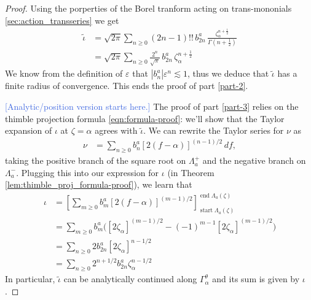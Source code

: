 \documentclass{article}
\newcommand{\fracderiv}[3]{\partial^{#1}_{#2, #3}}
\newcommand{\laplace}{\mathcal{L}}
\theoremstyle{definition}
\theoremstyle{plain}
\begin{document}
{\begin{proof}
Using the porperties of the Borel tranform acting on trans-mononials \ref{sec:action_transseries} we get 
\begin{align*}
\tilde{\iota} & = \sqrt{2\pi} \sum_{n \ge 0} (2n - 1)!! \,b_{2n}^a\,\frac{\zeta_\alpha^{n+\tfrac{1}{2}}}{\Gamma(n+\tfrac{1}{2})} \\
&= \sqrt{2\pi} \sum_{n \ge 0} \frac{2^n}{\sqrt{\pi}} \,b_{2n}^a\,\zeta_\alpha^{n+\tfrac{1}{2}}
\end{align*}
We know from the definition of $\varepsilon$ that $\left|b_n^a\right| \varepsilon^n \lesssim 1$, thus we deduce that $\tilde{\iota}$ has a finite radius of convergence. This ends the proof of part \ref{part-2}. %

\textcolor{RoyalBlue}{[Analytic/position version starts here.]} The proof of part \ref{part-3} relies on the thimble projection formula \eqref{eqn:formula-proof}: we'll show that the Taylor expansion of $\iota$ at $\zeta=\alpha$ agrees with $\tilde{\iota}$. We can rewrite the Taylor series for $\nu$ as
\begin{align*}
\nu & = \sum_{n \ge 0} b_n^a [2(f - \alpha)]^{(n - 1)/2}\,df,
\end{align*}
taking the positive branch of the square root on $\Lambda^+_a$ and the negative branch on $\Lambda^-_a$. Plugging this into our expression for $\iota$ (in Theorem \ref{lem:thimble_proj_formula-proof}), we learn that
\begin{align*}
\iota & = \left[ \sum_{m \ge 0} b_m^a [2(f - \alpha)]^{(m - 1)/2} \right]_{\operatorname{start} \Lambda_a(\zeta)}^{\operatorname{end} \Lambda_a(\zeta)} \\
& = \sum_{m \ge 0} b_m^a \Big( [2\zeta_\alpha]^{(m - 1)/2} - (-1)^{m-1}[2\zeta_\alpha]^{(m - 1)/2} \Big) \\
& = \sum_{n \ge 0} 2 b_{2n}^a [2\zeta_\alpha]^{n - 1/2} \\
& = \sum_{n \ge 0} 2^{n+1/2} b_{2n}^a \zeta_\alpha^{n - 1/2}
\end{align*}
In particular, $\tilde{\iota}$ can be analytically continued along $\Gamma_\alpha^\theta$ and its sum is given by $\iota$. %


\end{proof}}
\end{document}
